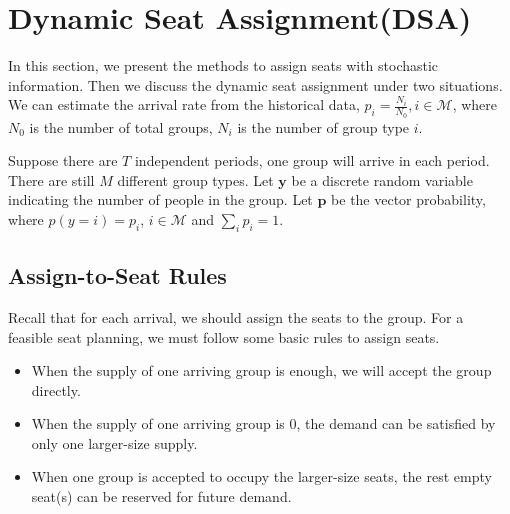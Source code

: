 
\section{Dynamic Seat Assignment(DSA)}
In this section, we present the methods to assign seats with stochastic information. Then we discuss the dynamic seat assignment under two situations. We can estimate the arrival rate from the historical data, $p_i = \frac{N_{i}}{N_{0}}, i \in \mathcal{M}$, where $N_{0}$ is the number of total groups, $N_{i}$ is the number of group type $i$.

Suppose there are $T$ independent periods, one group will arrive in each period.
There are still $M$ different group types. Let $\mathbf{y}$ be a discrete random variable indicating the number of people in the group. Let $\mathbf{p}$ be the vector probability, where $p(y = i) = p_i$, $i \in \mathcal{M}$ and $\sum_{i} p_{i} =1$. 





\subsection{Assign-to-Seat Rules}\label{nested_policy}
Recall that for each arrival, we should assign the seats to the group. 
For a feasible seat planning, we must follow some basic rules to assign seats.
\begin{itemize}
    \item When the supply of one arriving group is enough, we will accept the group directly.
    \item When the supply of one arriving group is 0, the demand can be satisfied by only one larger-size supply.
    \item When one group is accepted to occupy the larger-size seats, the rest empty seat(s) can be reserved for future demand.
\end{itemize}

